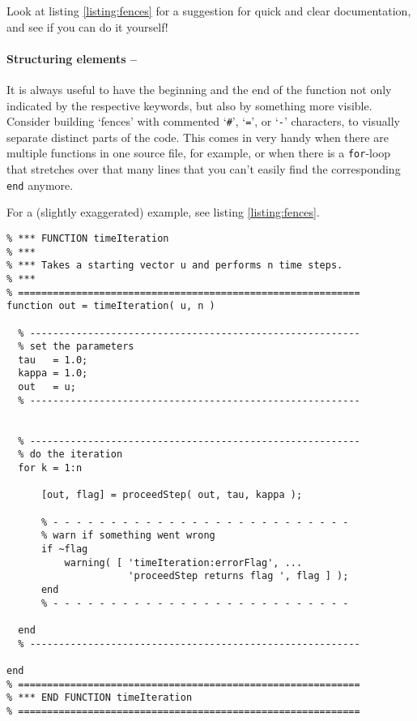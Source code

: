 Look at listing \ref{listing:fences} for a suggestion for quick and clear documentation, and see if you can do it yourself!


\paragraph{Structuring elements -- \cleansymbol\cleansymbol\cleansymbol}
It is always useful to have the beginning and the end of the function not only indicated by the respective keywords, but also by something more visible. Consider building `fences' with commented `\lstinline!#!', `\lstinline!=!', or `\lstinline!-!' characters, to visually separate distinct parts of the code. This comes in very handy when there are multiple functions in one source file, for example, or when there is a \lstinline!for!-loop that stretches over that many lines that you can't easily find the corresponding \lstinline!end! anymore.

For a (slightly exaggerated) example, see listing \ref{listing:fences}.

\begin{lstlisting}[float,label={listing:fences},caption={Function in which `\lstinline!-!'-fences are used to emphasize the functionally separate sections of the code.}]
% ===========================================================
% *** FUNCTION timeIteration
% ***
% *** Takes a starting vector u and performs n time steps.
% ***
% ===========================================================
function out = timeIteration( u, n )

  % ---------------------------------------------------------
  % set the parameters
  tau   = 1.0;
  kappa = 1.0;
  out   = u;
  % ---------------------------------------------------------


  % ---------------------------------------------------------
  % do the iteration
  for k = 1:n

      [out, flag] = proceedStep( out, tau, kappa );

      % - - - - - - - - - - - - - - - - - - - - - - - - - -
      % warn if something went wrong
      if ~flag
          warning( [ 'timeIteration:errorFlag', ...
                     'proceedStep returns flag ', flag ] );
      end
      % - - - - - - - - - - - - - - - - - - - - - - - - - -

  end
  % ---------------------------------------------------------

end
% ===========================================================
% *** END FUNCTION timeIteration
% ===========================================================
\end{lstlisting}



